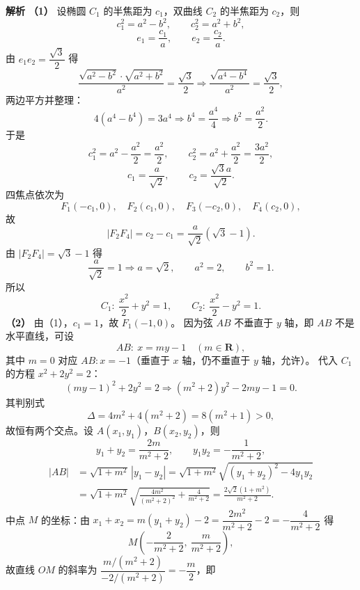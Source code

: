 \begin{answer}
\textbf{解析}
\textbf{（1）} 设椭圆 $C_1$ 的半焦距为 $c_1$，双曲线 $C_2$ 的半焦距为 $c_2$，则
\nopagebreak[4]
\[c_1^2=a^2-b^2,\qquad c_2^2=a^2+b^2,\]
\nopagebreak[4]
\[e_1=\frac{c_1}a,\qquad e_2=\frac{c_2}a .\]
由 $e_1e_2=\dfrac{\sqrt3}2$ 得
\nopagebreak[4]
\[\frac{\sqrt{a^2-b^2}\cdot\sqrt{a^2+b^2}}{a^2}=\frac{\sqrt3}2
\Longrightarrow\frac{\sqrt{a^4-b^4}}{a^2}=\frac{\sqrt3}2,\]
两边平方并整理：
\nopagebreak[4]
\[4\left(a^4-b^4\right)=3a^4\Longrightarrow b^4=\frac{a^4}4\Longrightarrow b^2=\frac{a^2}2 .\]
于是
\nopagebreak[4]
\[c_1^2=a^2-\frac{a^2}2=\frac{a^2}2,\qquad c_2^2=a^2+\frac{a^2}2=\frac{3a^2}2,\]
\nopagebreak[4]
\[c_1=\frac{a}{\sqrt2},\qquad c_2=\frac{\sqrt3a}{\sqrt2} .\]
四焦点依次为
\nopagebreak[4]
\[F_1(-c_1,0),\quad F_2(c_1,0),\quad F_3(-c_2,0),\quad F_4(c_2,0),\]
故
\nopagebreak[4]
\[|F_2F_4|=c_2-c_1=\frac{a}{\sqrt2}\left(\sqrt3-1\right).\]
由 $|F_2F_4|=\sqrt3-1$ 得
\nopagebreak[4]
\[\frac a{\sqrt2}=1\Longrightarrow a=\sqrt2,\qquad a^2=2,\qquad b^2=1 .\]
所以
\nopagebreak[4]
\[C_1:\ \frac{x^2}2+y^2=1,\qquad C_2:\ \frac{x^2}2-y^2=1 .\]
\textbf{（2）} 由（1），$c_1=1$，故 $F_1(-1,0)$。
因为弦 $AB$ 不垂直于 $y$ 轴，即 $AB$ 不是水平直线，可设
\nopagebreak[4]
\[AB:\ x=my-1\quad(m\in\mathbf R),\]
其中 $m=0$ 对应 $AB:x=-1$（垂直于 $x$ 轴，仍不垂直于 $y$ 轴，允许）。
代入 $C_1$ 的方程 $x^2+2y^2=2$：
\nopagebreak[4]
\[(my-1)^2+2y^2=2\Longrightarrow\left(m^2+2\right)y^2-2my-1=0 .\]
其判别式
\nopagebreak[4]
\[\Delta=4m^2+4\left(m^2+2\right)=8\left(m^2+1\right)>0,\]
故恒有两个交点。设 $A(x_1,y_1)$，$B(x_2,y_2)$，则
\nopagebreak[4]
\[y_1+y_2=\frac{2m}{m^2+2},\qquad y_1y_2=-\frac1{m^2+2},\]
\nopagebreak[4]
\[\begin{aligned}
|AB|&=\sqrt{1+m^2}\,|y_1-y_2|
=\sqrt{1+m^2}\sqrt{\left(y_1+y_2\right)^2-4y_1y_2}\\
&=\sqrt{1+m^2}\sqrt{\frac{4m^2}{\left(m^2+2\right)^2}+\frac4{m^2+2}}
=\frac{2\sqrt2\left(1+m^2\right)}{m^2+2}.
\end{aligned}\]
中点 $M$ 的坐标：由 $x_1+x_2=m\left(y_1+y_2\right)-2=\dfrac{2m^2}{m^2+2}-2=-\dfrac4{m^2+2}$ 得
\nopagebreak[4]
\[M\left(-\frac2{m^2+2},\ \frac{m}{m^2+2}\right),\]
故直线 $OM$ 的斜率为 $\dfrac{m/(m^2+2)}{-2/(m^2+2)}=-\dfrac m2$，即

\end{answer}
